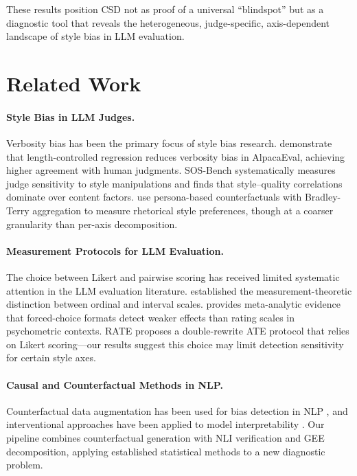 \documentclass[11pt,a4paper]{article}
\begin{document}
These results position CSD not as proof of a universal ``blindspot'' but as a diagnostic tool that reveals the heterogeneous, judge-specific, axis-dependent landscape of style bias in LLM evaluation.

\section{Related Work}

\paragraph{Style Bias in LLM Judges.}
Verbosity bias has been the primary focus of style bias research. \citet{lcalpacaeval2025} demonstrate that length-controlled regression reduces verbosity bias in AlpacaEval, achieving higher agreement with human judgments. SOS-Bench \citep{sosbench2025} systematically measures judge sensitivity to style manipulations and finds that style--quality correlations dominate over content factors. \citet{counterfactual_rhetorical2025} use persona-based counterfactuals with Bradley-Terry aggregation to measure rhetorical style preferences, though at a coarser granularity than per-axis decomposition.

\paragraph{Measurement Protocols for LLM Evaluation.}
The choice between Likert and pairwise scoring has received limited systematic attention in the LLM evaluation literature. \citet{stevens1946} established the measurement-theoretic distinction between ordinal and interval scales. \citet{decoster2011} provides meta-analytic evidence that forced-choice formats detect weaker effects than rating scales in psychometric contexts. RATE \citep{rate2025} proposes a double-rewrite ATE protocol that relies on Likert scoring---our results suggest this choice may limit detection sensitivity for certain style axes.

\paragraph{Causal and Counterfactual Methods in NLP.}
Counterfactual data augmentation has been used for bias detection in NLP \citep{zmigrod2019}, and interventional approaches have been applied to model interpretability \citep{vig2020}. Our pipeline combines counterfactual generation with NLI verification and GEE decomposition, applying established statistical methods to a new diagnostic problem.
\end{document}
